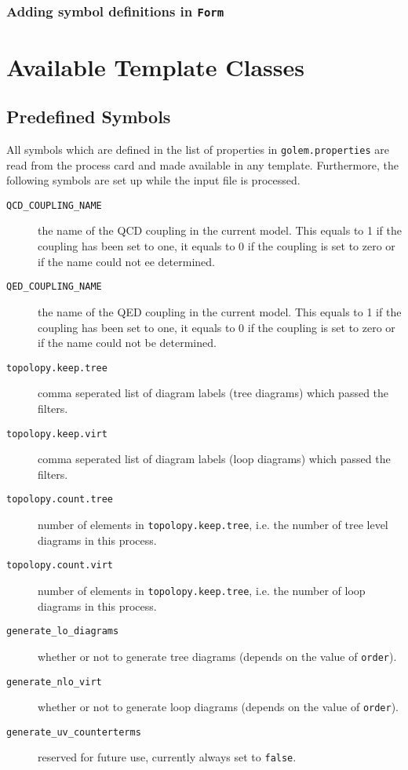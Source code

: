 \documentclass[11pt,a4paper]{refrep}
\newcommand{\form}{{\tt Form}\xspace}
\begin{document}
\subsection{Adding symbol definitions in \form}

\appendix
{}
\chapter{Available Template Classes}
\label{appendix:template-classes}

\section{Predefined Symbols}
All symbols which are defined in the list of properties
in \texttt{golem.properties} are read from the process card and
made available in any template. Furthermore, the following symbols
are set up while the input file is processed.
\begin{description}
\item[\texttt{QCD\_COUPLING\_NAME}] the name of the QCD coupling in the
current model. This equals to 1 if the coupling has been set to one,
it equals to 0 if the coupling is set to zero or if the name could not
ee determined.
\item[\texttt{QED\_COUPLING\_NAME}] the name of the QED coupling in the
current model. This equals to 1 if the coupling has been set to one,
it equals to 0 if the coupling is set to zero or if the name could not
be determined.
\item[\texttt{topolopy.keep.tree}] comma seperated list of diagram labels
(tree diagrams) which passed the filters.
\item[\texttt{topolopy.keep.virt}] comma seperated list of diagram labels
(loop diagrams) which passed the filters.
\item[\texttt{topolopy.count.tree}] number of elements in
\texttt{topolopy.keep.tree}, i.e. the number of tree level diagrams in this
process.
\item[\texttt{topolopy.count.virt}] number of elements in
\texttt{topolopy.keep.tree}, i.e. the number of loop diagrams in this
process.
\item[\texttt{generate\_lo\_diagrams}] whether or not to generate tree
diagrams (depends on the value of \texttt{order}).
\item[\texttt{generate\_nlo\_virt}] whether or not to generate loop
diagrams (depends on the value of \texttt{order}).
\item[\texttt{generate\_uv\_counterterms}] reserved for future use,
currently always set to \texttt{false}.
\end{description}
\bigskip
\end{document}
